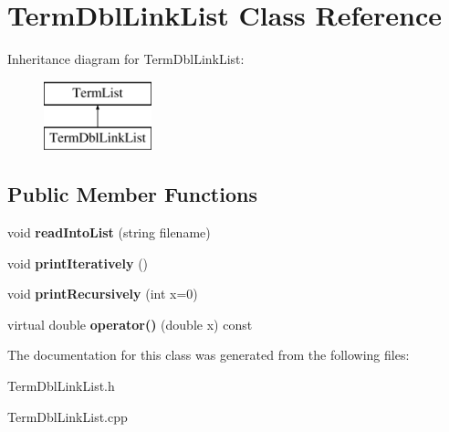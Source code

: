 \hypertarget{classTermDblLinkList}{\section{Term\-Dbl\-Link\-List Class Reference}
\label{classTermDblLinkList}
}
Inheritance diagram for Term\-Dbl\-Link\-List\-:\begin{figure}[H]
\begin{center}
\leavevmode
\includegraphics[height=2.000000cm]{classTermDblLinkList}
\end{center}
\end{figure}
\subsection*{Public Member Functions}
\begin{DoxyCompactItemize}
\item 
\hypertarget{classTermDblLinkList_abc5166e40aaeb0988c905cd25e1ba167}{void {\bfseries read\-Into\-List} (string filename)}\label{classTermDblLinkList_abc5166e40aaeb0988c905cd25e1ba167}

\item 
\hypertarget{classTermDblLinkList_a6acc67af3d9536fd2c409e179bec05b3}{void {\bfseries print\-Iteratively} ()}\label{classTermDblLinkList_a6acc67af3d9536fd2c409e179bec05b3}

\item 
\hypertarget{classTermDblLinkList_aa00c9ea87584a884888839ade9a1cfef}{void {\bfseries print\-Recursively} (int x=0)}\label{classTermDblLinkList_aa00c9ea87584a884888839ade9a1cfef}

\item 
\hypertarget{classTermDblLinkList_a0fb0c30585ad15c0059f3bcb44e2fab2}{virtual double {\bfseries operator()} (double x) const }\label{classTermDblLinkList_a0fb0c30585ad15c0059f3bcb44e2fab2}

\end{DoxyCompactItemize}


The documentation for this class was generated from the following files\-:\begin{DoxyCompactItemize}
\item 
Term\-Dbl\-Link\-List.\-h\item 
Term\-Dbl\-Link\-List.\-cpp\end{DoxyCompactItemize}
